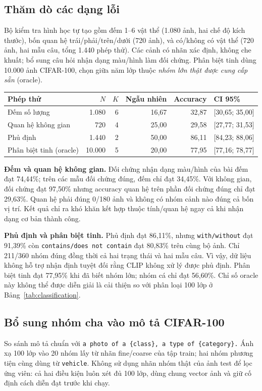 \documentclass[11pt,a4paper]{article}
\begin{document}
\subsection{Thăm dò các dạng lỗi}
Bộ kiểm tra hình học tự tạo gồm đếm 1--6 vật thể (1.080 ảnh, hai chế độ kích thước), bốn quan hệ trái/phải/trên/dưới (720 ảnh), và có/không có vật thể (720 ảnh, hai mẫu câu, tổng 1.440 phép thử). Các cảnh có nhãn xác định, không che khuất; bổ sung câu hỏi nhận dạng màu/hình làm đối chứng. Phân biệt tinh dùng 10.000 ảnh CIFAR-100, chọn giữa năm lớp thuộc \emph{nhóm lớn thật được cung cấp sẵn} (oracle).
\begin{center}
\label{tab:probes}
\begin{tabular}{@{}lrrrrl@{}}
\toprule
Phép thử & $N$ & $K$ & Ngẫu nhiên & Accuracy & CI 95\% \\
\midrule
Đếm số lượng & 1.080 & 6 & 16,67 & 32,87 & [30,65; 35,00] \\
Quan hệ không gian & 720 & 4 & 25,00 & 29,58 & [27,77; 31,53] \\
Phủ định & 1.440 & 2 & 50,00 & 86,11 & [84,23; 88,06] \\
Phân biệt tinh (oracle) & 10.000 & 5 & 20,00 & 77,95 & [77,16; 78,77] \\
\bottomrule
\end{tabular}
\end{center}
\vspace{-5pt}
\newpage
\textbf{Đếm và quan hệ không gian.} Đối chứng nhận dạng màu/hình của bài đếm đạt 74,44\%; trên các mẫu đối chứng đúng, đếm chỉ đạt 34,45\%. Với không gian, đối chứng đạt 97,50\% nhưng accuracy quan hệ trên phần đối chứng đúng chỉ đạt 29,63\%. Quan hệ phải đúng 0/180 ảnh và không có nhóm cảnh nào đúng cả bốn vị trí. Kết quả chỉ ra khó khăn kết hợp thuộc tính/quan hệ ngay cả khi nhận dạng cơ bản thành công.

\textbf{Phủ định và phân biệt tinh.} Phủ định đạt 86,11\%, nhưng \texttt{with/without} đạt 91,39\% còn \texttt{contains/does not contain} đạt 80,83\% trên cùng bộ ảnh. Chỉ 211/360 nhóm đúng đồng thời cả hai trạng thái và hai mẫu câu. Vì vậy, dữ liệu không hỗ trợ nhận định tuyệt đối rằng CLIP không xử lý được phủ định. Phân biệt tinh đạt 77,95\% khi đã biết nhóm lớn; nhóm cá chỉ đạt 56,60\%. Chỉ số oracle này không thể được diễn giải là cải thiện so với phân loại 100 lớp ở Bảng~\ref{tab:classification}.

\subsection{Bổ sung nhóm cha vào mô tả CIFAR-100}
So sánh mô tả chuẩn với \texttt{a photo of a \{class\}, a type of \{category\}.} Ánh xạ 100 lớp vào 20 nhóm lấy từ nhãn fine/coarse của tập train; hai nhóm phương tiện cùng dùng từ \texttt{vehicle}. Không sử dụng nhãn nhóm thật của ảnh test để lọc ứng viên: cả hai điều kiện luôn xét đủ 100 lớp, dùng chung vector ảnh và giữ cố định cách diễn đạt trước khi chạy.
\end{document}
